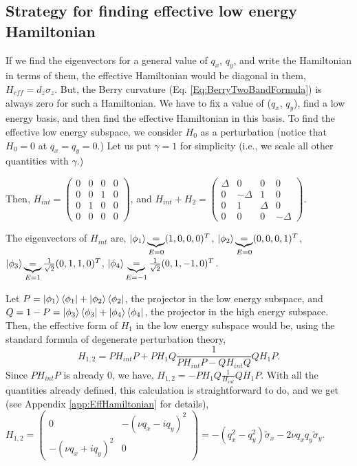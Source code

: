 \documentclass{report}
\begin{document}
\subsection{Strategy for finding effective low energy Hamiltonian}
If we find the eigenvectors for a general value of $q_x$, $q_y$, and write the Hamiltonian in terms of them, the effective Hamiltonian would be diagonal in them, $H_{eff} = d_z \sigma_z$. But, the Berry curvature (Eq. \eqref{Eq:BerryTwoBandFormula}) is always zero for such a Hamiltonian. We have to fix a value of ($q_x$, $q_y$), find a low energy basis, and then find the effective Hamiltonian in this basis.
To find the effective low energy subspace, we consider $H_0$ as a perturbation (notice that $H_0 = 0$ at $q_x = q_y =0$.) Let us put $\gamma = 1$ for simplicity (i.e., we scale all other quantities with $\gamma$.)

Then, $H_{int} = \begin{pmatrix}
	0 & 0 & 0 & 0 \\
	0 & 0 & 1 & 0 \\
	0 & 1 & 0 & 0 \\
	0 & 0 & 0 & 0 
\end{pmatrix}$, and $ H_{int} + H_2 = \begin{pmatrix}
	\Delta & 0 & 0 & 0 \\
	0 & -\Delta & 1 & 0 \\
	0 & 1 & \Delta & 0 \\
	0 & 0 & 0 & -\Delta 
\end{pmatrix} $.

The eigenvectors of $H_{int}$ are, $\ket{\phi_1} \underbrace{=}_{E = 0} (1,0,0,0)^T$, $\ket{\phi_2} \underbrace{=}_{E = 0} (0,0,0,1)^T$,
$\ket{\phi_3} \underbrace{=}_{E = 1} \frac{1}{\sqrt{2}}(0,1,1,0)^T$,
$\ket{\phi_4} \underbrace{=}_{E = -1} \frac{1}{\sqrt{2}}(0,1,-1,0)^T$.

Let $P = \ket{\phi_1}\bra{\phi_1} + \ket{\phi_2}\bra{\phi_2}$, the projector in the low energy subspace, and $Q = 1 - P = \ket{\phi_3}\bra{\phi_3} + \ket{\phi_4}\bra{\phi_4}$, the projector in the high energy subspace.
Then, the effective form of $H_1$ in the low energy subspace would be, using the standard formula of degenerate perturbation theory,
$$H_{1,2} = P H_{int} P + P H_1 Q \frac{1}{P H_{int} P - Q H_{int} Q} Q H_1 P .$$
Since $P H_{int} P$ is already 0, we have, $H_{1,2} =- P H_1 Q \frac{1}{H_{int}} Q H_1 P$. With all the quantities already defined, this calculation is straightforward to do, and we get (see Appendix \ref{app:EffHamiltonian} for details), $H_{1,2} = \begin{pmatrix}
	0 & -(\nu q_x - i q_y)^2\\
	-(\nu q_x + i q_y)^2 & 0
\end{pmatrix} = -(q_x^2 - q_y^2) \tilde{\sigma}_x - 2 \nu q_x q_y \tilde{\sigma}_y$.
\end{document}
